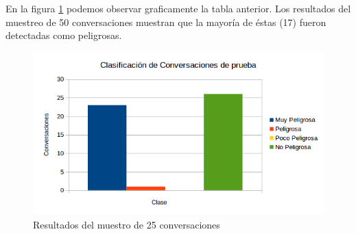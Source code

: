 En la figura \ref{fig:ClasificacionConv} podemos observar graficamente la tabla anterior. Los resultados del muestreo de 50 conversaciones muestran que la mayor\'ia de \'estas (17) fueron detectadas como peligrosas.

\begin{figure}[h]
\begin{center}
\includegraphics[scale=.7]{images/grafica/ClasificacionConv}
\caption{Resultados del muestro de 25 conversaciones}
\label{fig:ClasificacionConv}
\end{center}
\end{figure}


